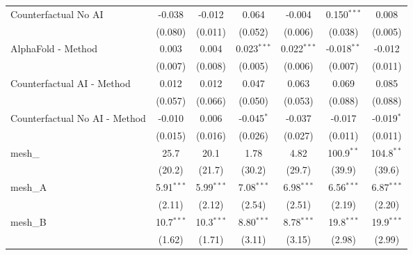 \begin{tabular}{lcccccc}
   Counterfactual No AI                                        & -0.038        & -0.012        & 0.064         & -0.004        & 0.150$^{***}$ & 0.008\\   
                                                               & (0.080)       & (0.011)       & (0.052)       & (0.006)       & (0.038)       & (0.005)\\   
   AlphaFold - Method                                          & 0.003         & 0.004         & 0.023$^{***}$ & 0.022$^{***}$ & -0.018$^{**}$ & -0.012\\   
                                                               & (0.007)       & (0.008)       & (0.005)       & (0.006)       & (0.007)       & (0.011)\\   
   Counterfactual AI - Method                                  & 0.012         & 0.012         & 0.047         & 0.063         & 0.069         & 0.085\\   
                                                               & (0.057)       & (0.066)       & (0.050)       & (0.053)       & (0.088)       & (0.088)\\   
   Counterfactual No AI - Method                               & -0.010        & 0.006         & -0.045$^{*}$  & -0.037        & -0.017        & -0.019$^{*}$\\   
                                                               & (0.015)       & (0.016)       & (0.026)       & (0.027)       & (0.011)       & (0.011)\\   
   mesh\_                                                      & 25.7          & 20.1          & 1.78          & 4.82          & 100.9$^{**}$  & 104.8$^{**}$\\   
                                                               & (20.2)        & (21.7)        & (30.2)        & (29.7)        & (39.9)        & (39.6)\\   
   mesh\_A                                                     & 5.91$^{***}$  & 5.99$^{***}$  & 7.08$^{***}$  & 6.98$^{***}$  & 6.56$^{***}$  & 6.87$^{***}$\\   
                                                               & (2.11)        & (2.12)        & (2.54)        & (2.51)        & (2.19)        & (2.20)\\   
   mesh\_B                                                     & 10.7$^{***}$  & 10.3$^{***}$  & 8.80$^{***}$  & 8.78$^{***}$  & 19.8$^{***}$  & 19.9$^{***}$\\   
                                                               & (1.62)        & (1.71)        & (3.11)        & (3.15)        & (2.98)        & (2.99)\\   

\end{tabular}

